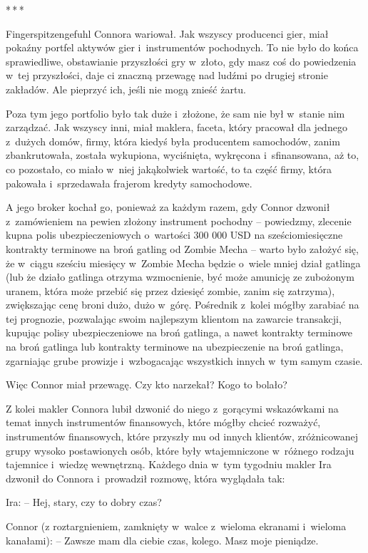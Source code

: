 \documentclass[oneside,polish,11pt,rmheadings]{mwbk}
\newcommand{\threeast}{\par\centerline{*\,*\,*}\medskip\par}
\begin{document}
\bigskip
\threeast

Fingerspitzengefuhl Connora wariował. Jak wszyscy producenci gier, miał pokaźny portfel aktywów gier i~instrumentów pochodnych. To nie było do końca sprawiedliwe, obstawianie przyszłości gry w~złoto, gdy masz coś do powiedzenia w~tej przyszłości, daje ci znaczną przewagę nad ludźmi po drugiej stronie zakładów. Ale pieprzyć ich, jeśli nie mogą znieść żartu.

Poza tym jego portfolio było tak duże i~złożone, że sam nie był w~stanie nim zarządzać. Jak wszyscy inni, miał maklera, faceta, który pracował dla jednego z~dużych domów, firmy, która kiedyś była producentem samochodów, zanim zbankrutowała, została wykupiona, wyciśnięta, wykręcona i~sfinansowana, aż to, co pozostało, co miało w~niej jakąkolwiek wartość, to ta część firmy, która pakowała i~sprzedawała frajerom kredyty samochodowe.

A jego broker kochał go, ponieważ za każdym razem, gdy Connor dzwonił z~zamówieniem na pewien złożony instrument pochodny -- powiedzmy, zlecenie kupna polis ubezpieczeniowych o~wartości 300 000 USD na sześciomiesięczne kontrakty terminowe na broń gatling od Zombie Mecha -- warto było założyć się, że w~ciągu sześciu miesięcy w~Zombie Mecha będzie o~wiele mniej dział gatlinga (lub że działo gatlinga otrzyma wzmocnienie, być może amunicję ze zubożonym uranem, która może przebić się przez dziesięć zombie, zanim się zatrzyma), zwiększając cenę broni dużo, dużo w~górę. Pośrednik z~kolei mógłby zarabiać na tej prognozie, pozwalając swoim najlepszym klientom na zawarcie transakcji, kupując polisy ubezpieczeniowe na broń gatlinga, a nawet kontrakty terminowe na broń gatlinga lub kontrakty terminowe na ubezpieczenie na broń gatlinga, zgarniając grube prowizje i~wzbogacając wszystkich innych w~tym samym czasie.

Więc Connor miał przewagę. Czy kto narzekał? Kogo to bolało? 

Z kolei makler Connora lubił dzwonić do niego z~gorącymi wskazówkami na temat innych instrumentów finansowych, które mógłby chcieć rozważyć, instrumentów finansowych, które przyszły mu od innych klientów, zróżnicowanej grupy wysoko postawionych osób, które były wtajemniczone w~różnego rodzaju tajemnice i~wiedzę wewnętrzną. Każdego dnia w~tym tygodniu makler Ira dzwonił do Connora i~prowadził rozmowę, która wyglądała tak:

\noindent Ira: -- Hej, stary, czy to dobry czas? 

\noindent Connor (z roztargnieniem, zamknięty w~walce z~wieloma ekranami i~wieloma kanałami): -- Zawsze mam dla ciebie czas, kolego. Masz moje pieniądze.
\end{document}
